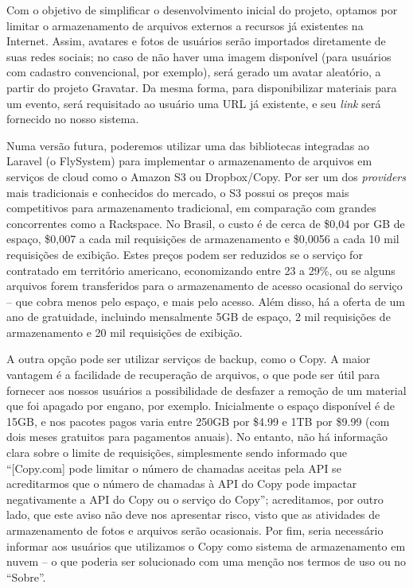 \documentclass[12pt,a4paper,twoside,hyphens,english,brazil]{abntex2}
\begin{document}
{Com o objetivo de simplificar o desenvolvimento inicial do projeto, optamos por limitar o armazenamento de arquivos externos a recursos já existentes na Internet. Assim, avatares e fotos de usuários serão importados diretamente de suas redes sociais; no caso de não haver uma imagem disponível (para usuários com cadastro convencional, por exemplo), será gerado um avatar aleatório, a partir do projeto Gravatar\footnotemark. Da mesma forma, para disponibilizar materiais para um evento, será requisitado ao usuário uma URL já existente, e seu \emph{link} será fornecido no nosso sistema.

Numa versão futura, poderemos utilizar uma das bibliotecas integradas ao Laravel (o FlySystem\cite{laravel-flysystem}) para implementar o armazenamento de arquivos em serviços de cloud como o Amazon S3 ou Dropbox/Copy\cite{flysystem}. Por ser um dos \emph{providers} mais tradicionais e conhecidos do mercado, o S3 possui os preços mais competitivos para armazenamento tradicional, em comparação com grandes concorrentes como a Rackspace. No Brasil, o custo é de cerca de \$0,04 por GB de espaço, \$0,007 a cada mil requisições de armazenamento e \$0,0056 a cada 10 mil requisições de exibição. Estes preços podem ser reduzidos se o serviço for contratado em território americano, economizando entre 23 a 29\%, ou se alguns arquivos forem transferidos para o armazenamento de acesso ocasional do serviço -- que cobra menos pelo espaço, e mais pelo acesso. Além disso, há a oferta de um ano de gratuidade, incluindo mensalmente 5GB de espaço, 2 mil requisições de armazenamento e 20 mil requisições de exibição.\cite{s3-pricing}

A outra opção pode ser utilizar serviços de backup, como o Copy. A maior vantagem é a facilidade de recuperação de arquivos, o que pode ser útil para fornecer aos nossos usuários a possibilidade de desfazer a remoção de um material que foi apagado por engano, por exemplo. Inicialmente o espaço disponível é de 15GB, e nos pacotes pagos varia entre 250GB por \$4.99 e 1TB por \$9.99 (com dois meses gratuitos para pagamentos anuais). No entanto, não há informação clara sobre o limite de requisições, simplesmente sendo informado que ``[Copy.com] pode limitar o número de chamadas aceitas pela API se acreditarmos que o número de chamadas à API do Copy pode impactar negativamente a API do Copy ou o serviço do Copy''\cite{copy-tos}; acreditamos, por outro lado, que este aviso não deve nos apresentar risco, visto que as atividades de armazenamento de fotos e arquivos serão ocasionais. Por fim, seria necessário informar aos usuários que utilizamos o Copy como sistema de armazenamento em nuvem\cite{copy-tos} -- o que poderia ser solucionado com uma menção nos termos de uso ou no ``Sobre''.


}
\end{document}
